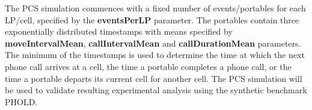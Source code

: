The PCS simulation commences with a fixed number of events/portables for each LP/cell, specified by the \textbf{eventsPerLP} parameter. The portables contain three exponentially distributed timestamps with means specified by \textbf{moveIntervalMean}, \textbf{callIntervalMean} and \textbf{callDurationMean} parameters. The minimum of the timestamps is used to  determine the time at which the next phone call arrives at a cell, the time a portable completes a phone call, or the time a portable departs its current cell for another cell. The PCS simulation will be used to validate resulting experimental analysis using the synthetic benchmark PHOLD.   
